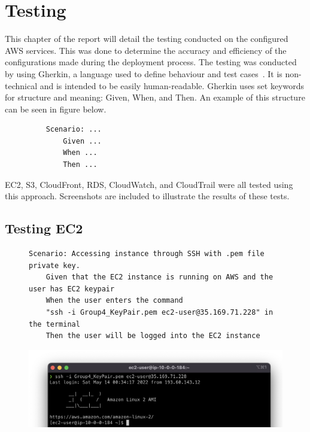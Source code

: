 \chapter{Testing}\label{ch:testing}
This chapter of the report will detail the testing conducted on the configured AWS services.
This was done to determine the accuracy and efficiency of the configurations made during the deployment process.
The testing was conducted by using Gherkin, a language used to define behaviour and test
cases~\parencite{dos2018automated}.
It is non-technical and is intended to be easily human-readable.
Gherkin uses set keywords for structure and meaning: Given, When, and Then.
An example of this structure can be seen in figure below.

\begin{figure}[!htbp]
    \centering
    \begin{verbatim}
    Scenario: ...
        Given ...
        When ...
        Then ...
    \end{verbatim}
    \label{fig:gherkin}
\end{figure}

EC2, S3, CloudFront, RDS, CloudWatch, and CloudTrail were all tested using this approach.
Screenshots are included to illustrate the results of these tests.

\section{Testing EC2}\label{sec:testing-ec2}
\begin{figure}[!htbp]
    \centering
    \begin{verbatim}
Scenario: Accessing instance through SSH with .pem file private key.
    Given that the EC2 instance is running on AWS and the user has EC2 keypair
    When the user enters the command
    "ssh -i Group4_KeyPair.pem ec2-user@35.169.71.228" in the terminal
    Then the user will be logged into the EC2 instance
    \end{verbatim}
    \label{fig:accessing-instance-ec2}
\end{figure}

\begin{figure}[!htbp]
    \centering
    \includegraphics[width=\textwidth]{resources/ec2/ec2-logged-in}
    \label{fig:ec2-test-logged-in}
\end{figure}


